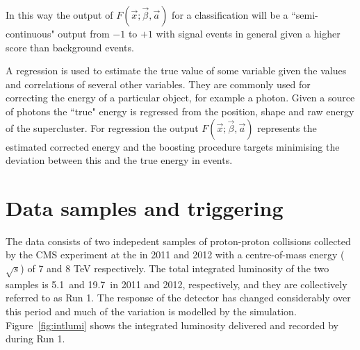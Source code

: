 In this way the output of $F(\vec{x};\vec{\beta},\vec{a})$ for a classification \BDT will be a ``semi-continuous" output from $-1$ to $+1$ with signal events in general given a higher score than background events.

A regression \BDT is used to estimate the true value of some variable given the values and correlations of several other variables. They are commonly used for correcting the energy of a particular object, for example a photon. Given a \MC source of photons the ``true" energy is regressed from the position, shape and raw energy of the supercluster. For regression \BDTs the output $F(\vec{x};\vec{\beta},\vec{a})$ represents the estimated corrected energy and the boosting procedure targets minimising the deviation between this and the true energy in \MC events. 

\section{Data samples and triggering}

The data consists of two indepedent samples of proton-proton collisions collected by the CMS experiment at the \LHC in 2011 and 2012 with a centre-of-mass energy ($\sqrt{s}$) of 7 and 8 TeV respectively. The total integrated luminosity of the two samples is 5.1~\fb and 19.7~\fb in 2011 and 2012, respectively, and they are collectively referred to as \LHC Run 1. The response of the detector has changed considerably over this period and much of the variation is modelled by the \MC simulation. Figure~\ref{fig:intlumi} shows the integrated luminosity delivered and recorded by \CMS during \LHC Run 1.

